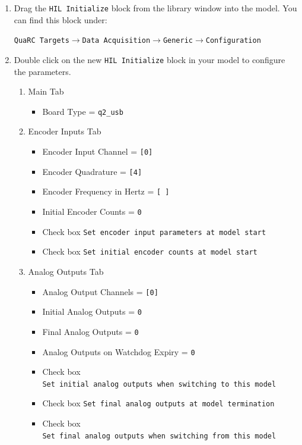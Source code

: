 \begin{enumerate}
    \item Drag the \verb|HIL Initialize| block from the library window into the
          model.  You can find this block under:
          \begin{center}
              \verb|QuaRC Targets|\(\to \)\verb|Data Acquisition|\(\to \)\verb|Generic|\(\to \)\verb|Configuration|
          \end{center}
    \item Double click on the new \verb|HIL Initialize| block in your model to
          configure the parameters.
          \begin{enumerate}
              \item Main Tab
                    \begin{itemize}
                        \item Board Type = \verb|q2_usb|
                    \end{itemize}
              \item Encoder Inputs Tab
                    \begin{itemize}
                        \item Encoder Input Channel = \verb|[0]|
                        \item Encoder Quadrature = \verb|[4]|
                        \item Encoder Frequency in Hertz = \verb|[ ]|
                        \item Initial Encoder Counts = \verb|0|
                        \item Check box \verb|Set encoder input parameters at model start|
                        \item Check box \verb|Set initial encoder counts at model start|
                    \end{itemize}
              \item Analog Outputs Tab
                    \begin{itemize}
                        \item Analog Output Channels = \verb|[0]|
                        \item Initial Analog Outputs = \verb|0|
                        \item Final Analog Outputs = \verb|0|
                        \item Analog Outputs on Watchdog Expiry = \verb|0|
                        \item Check box\\
                              \verb|Set initial analog outputs when switching to this model|
                        \item Check box \verb|Set final analog outputs at model termination|
                        \item Check box\\
                              \verb|Set final analog outputs when switching from this model|
                    \end{itemize}
          \end{enumerate}


\end{enumerate}
